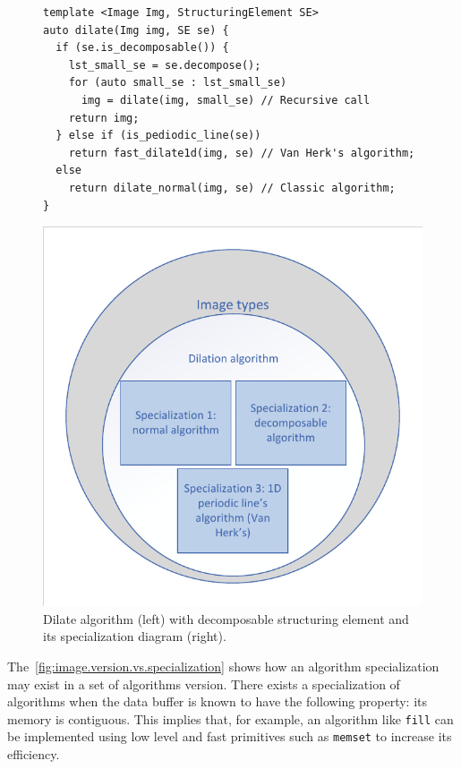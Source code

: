 \begin{figure}[htbp]
  \begin{minipage}[l]{0.48\linewidth}
    \begin{verbatim}
template <Image Img, StructuringElement SE>
auto dilate(Img img, SE se) {
  if (se.is_decomposable()) {
    lst_small_se = se.decompose();
    for (auto small_se : lst_small_se)
      img = dilate(img, small_se) // Recursive call
    return img;
  } else if (is_pediodic_line(se))
    return fast_dilate1d(img, se) // Van Herk's algorithm;
  else
    return dilate_normal(img, se) // Classic algorithm;
}
\end{verbatim}
  \end{minipage}
  \hfill
  \begin{minipage}[r]{0.48\linewidth}
    \centering
    \includegraphics[scale=0.5]{../figures/dilation_specialization_diagram}
  \end{minipage}
  \caption{Dilate algorithm (left) with decomposable structuring element and its specialization diagram (right).}
  \label{fig:dilation.specialization.alg.diagram}
\end{figure}

The~\cref{fig:image.version.vs.specialization} shows how an algorithm specialization may exist in a set of algorithms
version. There exists a specialization of algorithms when the data buffer is known to have the following property: its
memory is contiguous. This implies that, for example, an algorithm like \texttt{fill} can be implemented using low level
and fast primitives such as \texttt{memset} to increase its efficiency.


